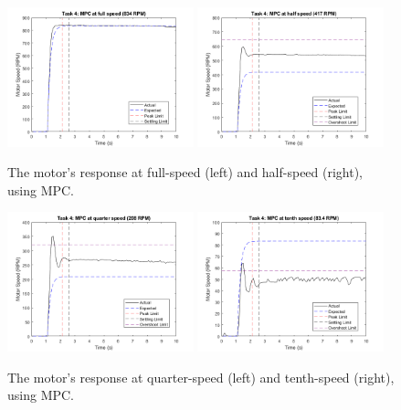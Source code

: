 \documentclass[11pt, onecolumn]{article}
\begin{document}
\begin{figure}[h!]
    \centering
    \includegraphics[width=0.48\textwidth]{q4-g1.png} \includegraphics[width=0.48\textwidth]{q4-g2.png}
    \caption{The motor's response at full-speed (left) and half-speed (right), using MPC.}
    \label{fig:q4-g1}
\end{figure}
\begin{figure}[h!]
    \centering
    \includegraphics[width=0.48\textwidth]{q4-g3.png} \includegraphics[width=0.48\textwidth]{q4-g4.png}
    \caption{The motor's response at quarter-speed (left) and tenth-speed (right), using MPC.}
    \label{fig:q4-g2}
\end{figure}



\end{document}

